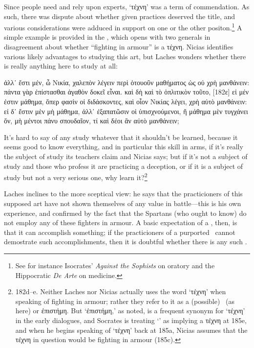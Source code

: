 \documentclass[11pt,letterpaper,oneside]{amsart} %
\begin{document}
Since people need and rely upon experts, `τέχνη' was a term of commendation. As such, there was dispute about whether given practices deserved the title, and various considerations were adduced in support on one or the other positon.\footnote{See for instance Isocrates' \emph{Against the Sophists} on oratory and the Hippocratic \emph{De Arte} on medicine.} A simple example is provided in the , which opens with two generals in disagreement about whether ``fighting in armour'' is a τέχνη. Nicias identifies various likely advantages to studying this art, but Laches wonders whether there is really anything here to study at all:\begin{squote}ἀλλ᾽ ἔστι μέν, ὦ Νικία, χαλεπὸν λέγειν περὶ ὁτουοῦν μαθήματος ὡς οὐ χρὴ μανθάνειν: πάντα γὰρ ἐπίστασθαι ἀγαθὸν δοκεῖ εἶναι. καὶ δὴ καὶ τὸ ὁπλιτικὸν τοῦτο, [182ε] εἰ μέν ἐστιν μάθημα, ὅπερ φασὶν οἱ διδάσκοντες, καὶ οἷον Νικίας λέγει, χρὴ αὐτὸ μανθάνειν: εἰ δ᾽ ἔστιν μὲν μὴ μάθημα, ἀλλ᾽ ἐξαπατῶσιν οἱ ὑπισχνούμενοι, ἢ μάθημα μὲν τυγχάνει ὄν, μὴ μέντοι πάνυ σπουδαῖον, τί καὶ δέοι ἂν αὐτὸ μανθάνειν;

\vspace{0.05in}

\noindent It's hard to say of any study whatever that it shouldn't be learned, because it seems good to know everything, and in particular this skill in arms, if it's really the subject of study its teachers claim and Nicias says; but if it's not a subject of study and those who profess it are practicing a deception, or if it is a subject of study but not a very serious one, why learn it?\footnote{182d--e. Neither Laches nor Nicias actually uses the word `τέχνη' when speaking of fighting in armour; rather they refer to it as a (possible) \mathema\ (as here) or ἐπιστήμη. But `ἐπιστήμη,' as noted, is a frequent synonym for `τέχνη' in the early dialogues, and Socrates is treating `\mathema' as implying a τέχνη at 185e, and when he begins speaking of `τέχνη' back at 185a, Nicias assumes that the τέχνη in question would be fighting in armour (185c).}\end{squote}Laches inclines to the more sceptical view: he says that the practicioners of this supposed art have not shown themselves of any value in battle---this is his own experience, and confirmed by the fact that the Spartans (who ought to know) do not employ any of these fighters in armour. A basic expectation of a \techne, then, is that it can accomplish something; if the practicioners of a purported \techne\ cannot demostrate such accomplishments, then it is doubtful whether there is any such \techne.%
\end{document}
